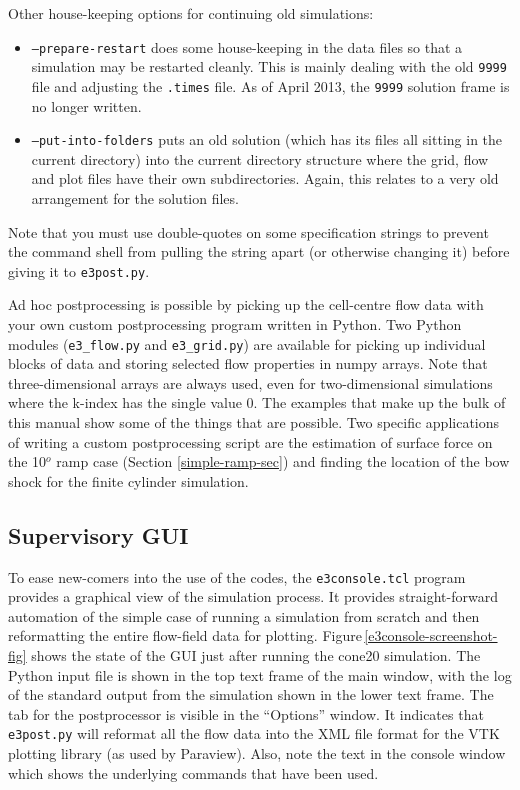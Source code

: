 Other house-keeping options for continuing old simulations:
\begin{itemize}
  \item \texttt{--prepare-restart} does some house-keeping in the data files so that a simulation 
     may be restarted cleanly.  
     This is mainly dealing with the old \texttt{9999} file and adjusting the \texttt{.times} file.
     As of April 2013, the \texttt{9999} solution frame is no longer written.
  \item \texttt{--put-into-folders} puts an old solution (which has its files all sitting in the current directory)
     into the current directory structure where the grid, flow and plot files have their own subdirectories.
     Again, this relates to a very old arrangement for the solution files.
\end{itemize}
Note that you must use double-quotes on some specification strings to prevent the command shell 
from pulling the string apart (or otherwise changing it) before giving it to \texttt{e3post.py}.

\medskip 
Ad hoc postprocessing is possible by picking up the cell-centre flow
data with your own custom postprocessing program written in Python.
Two Python modules (\texttt{e3\_flow.py} and \texttt{e3\_grid.py}) 
are available for picking up individual blocks of data and storing
selected flow properties in numpy arrays.
Note that three-dimensional arrays are always used, even for two-dimensional simulations
where the k-index has the single value 0.
The examples that make up the bulk of this manual show some of the things that are possible.
Two specific applications of writing a custom postprocessing script are the estimation of 
surface force on the 10$^o$ ramp case (Section \ref{simple-ramp-sec}) and 
finding the location of the bow shock for the finite cylinder simulation.

\subsection{Supervisory GUI}
%
To ease new-comers into the use of the codes, the \texttt{e3console.tcl} program provides
a graphical view of the simulation process.
It provides straight-forward automation of the simple case of running a simulation
from scratch and then reformatting the entire flow-field data for plotting.
Figure\,\ref{e3console-screenshot-fig} shows the state of the GUI just after running the
cone20 simulation.
The Python input file is shown in the top text frame of the main window, 
with the log of the standard output from the simulation shown in the lower text frame.
The tab for the postprocessor is visible in the ``Options'' window.
It indicates that \texttt{e3post.py} will reformat all the flow data into the XML
file format for the VTK plotting library (as used by Paraview).
Also, note the text in the console window which shows the underlying commands that have been used. 


